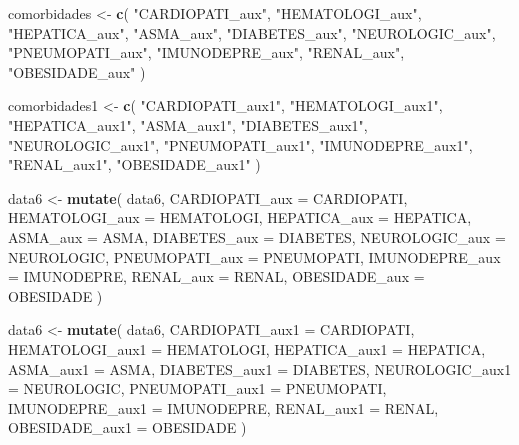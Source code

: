 \documentclass[
]{article}
\newenvironment{Shaded}{\begin{snugshade}}{\end{snugshade}}
\newcommand{\DataTypeTok}[1]{\textcolor[rgb]{0.13,0.29,0.53}{#1}}
\newcommand{\KeywordTok}[1]{\textcolor[rgb]{0.13,0.29,0.53}{\textbf{#1}}}
\newcommand{\NormalTok}[1]{#1}
\newcommand{\StringTok}[1]{\textcolor[rgb]{0.31,0.60,0.02}{#1}}
\begin{document}
\begin{Shaded}
\begin{Highlighting}[]
\NormalTok{comorbidades <-}
\StringTok{  }\KeywordTok{c}\NormalTok{(}
    \StringTok{"CARDIOPATI_aux"}\NormalTok{,}
    \StringTok{"HEMATOLOGI_aux"}\NormalTok{,}
    \StringTok{"HEPATICA_aux"}\NormalTok{,}
    \StringTok{"ASMA_aux"}\NormalTok{,}
    \StringTok{"DIABETES_aux"}\NormalTok{,}
    \StringTok{"NEUROLOGIC_aux"}\NormalTok{,}
    \StringTok{"PNEUMOPATI_aux"}\NormalTok{,}
    \StringTok{"IMUNODEPRE_aux"}\NormalTok{,}
    \StringTok{"RENAL_aux"}\NormalTok{,}
    \StringTok{"OBESIDADE_aux"}
\NormalTok{  )}

\NormalTok{comorbidades1 <-}
\StringTok{  }\KeywordTok{c}\NormalTok{(}
    \StringTok{"CARDIOPATI_aux1"}\NormalTok{,}
    \StringTok{"HEMATOLOGI_aux1"}\NormalTok{,}
    \StringTok{"HEPATICA_aux1"}\NormalTok{,}
    \StringTok{"ASMA_aux1"}\NormalTok{,}
    \StringTok{"DIABETES_aux1"}\NormalTok{,}
    \StringTok{"NEUROLOGIC_aux1"}\NormalTok{,}
    \StringTok{"PNEUMOPATI_aux1"}\NormalTok{,}
    \StringTok{"IMUNODEPRE_aux1"}\NormalTok{,}
    \StringTok{"RENAL_aux1"}\NormalTok{,}
    \StringTok{"OBESIDADE_aux1"}
\NormalTok{  )}

\NormalTok{data6 <-}
\StringTok{  }\KeywordTok{mutate}\NormalTok{(}
\NormalTok{    data6,}
    \DataTypeTok{CARDIOPATI_aux =}\NormalTok{ CARDIOPATI,}
    \DataTypeTok{HEMATOLOGI_aux =}\NormalTok{ HEMATOLOGI,}
    \DataTypeTok{HEPATICA_aux =}\NormalTok{ HEPATICA,}
    \DataTypeTok{ASMA_aux =}\NormalTok{ ASMA,}
    \DataTypeTok{DIABETES_aux =}\NormalTok{ DIABETES,}
    \DataTypeTok{NEUROLOGIC_aux =}\NormalTok{ NEUROLOGIC,}
    \DataTypeTok{PNEUMOPATI_aux =}\NormalTok{ PNEUMOPATI,}
    \DataTypeTok{IMUNODEPRE_aux =}\NormalTok{ IMUNODEPRE,}
    \DataTypeTok{RENAL_aux =}\NormalTok{ RENAL,}
    \DataTypeTok{OBESIDADE_aux =}\NormalTok{ OBESIDADE}
\NormalTok{  )}

\NormalTok{data6 <-}
\StringTok{  }\KeywordTok{mutate}\NormalTok{(}
\NormalTok{    data6,}
    \DataTypeTok{CARDIOPATI_aux1 =}\NormalTok{ CARDIOPATI,}
    \DataTypeTok{HEMATOLOGI_aux1 =}\NormalTok{ HEMATOLOGI,}
    \DataTypeTok{HEPATICA_aux1 =}\NormalTok{ HEPATICA,}
    \DataTypeTok{ASMA_aux1 =}\NormalTok{ ASMA,}
    \DataTypeTok{DIABETES_aux1 =}\NormalTok{ DIABETES,}
    \DataTypeTok{NEUROLOGIC_aux1 =}\NormalTok{ NEUROLOGIC,}
    \DataTypeTok{PNEUMOPATI_aux1 =}\NormalTok{ PNEUMOPATI,}
    \DataTypeTok{IMUNODEPRE_aux1 =}\NormalTok{ IMUNODEPRE,}
    \DataTypeTok{RENAL_aux1 =}\NormalTok{ RENAL,}
    \DataTypeTok{OBESIDADE_aux1 =}\NormalTok{ OBESIDADE}
\NormalTok{  )}


\end{Highlighting}
\end{Shaded}
\end{document}
